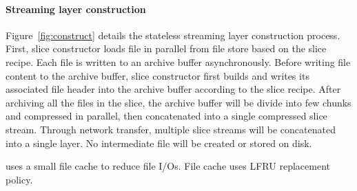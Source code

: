 \paragraph{Streaming layer construction}
Figure~\ref{fig:construct} details the stateless streaming layer construction process.
First, slice constructor loads file in parallel from file store based on the slice recipe.
Each file is written to an archive buffer asynchronously.
Before writing file content to the archive buffer, slice constructor first builds and writes its
associated 
file header into the archive buffer according to the slice recipe. 
After archiving all the files in the slice,
the archive buffer will be divide into few chunks and compressed in parallel,
then concatenated into a single compressed slice stream.
Through network transfer, multiple slice streams will be concatenated into a single layer.
No intermediate file will be created or stored on disk.

\sysname uses a small file cache to reduce file I/Os. 
File cache uses LFRU replacement policy.

 
